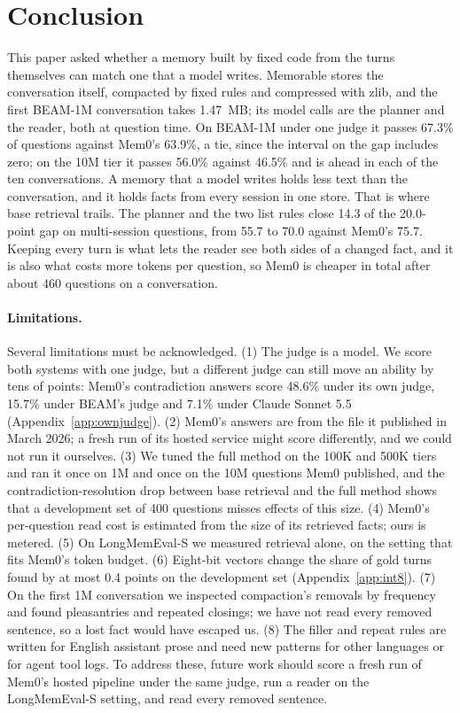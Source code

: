 \section{Conclusion}
\label{sec:conclusion}

This paper asked whether a memory built by fixed code from the turns themselves can match one that a model writes. Memorable stores the conversation itself, compacted by fixed rules and compressed with zlib, and the first BEAM-1M conversation takes 1.47~MB; its model calls are the planner and the reader, both at question time. On BEAM-1M under one judge it passes 67.3\% of questions against Mem0's 63.9\%, a tie, since the interval on the gap includes zero; on the 10M tier it passes 56.0\% against 46.5\% and is ahead in each of the ten conversations. A memory that a model writes holds less text than the conversation, and it holds facts from every session in one store. That is where base retrieval trails. The planner and the two list rules close 14.3 of the 20.0-point gap on multi-session questions, from 55.7 to 70.0 against Mem0's 75.7. Keeping every turn is what lets the reader see both sides of a changed fact, and it is also what costs more tokens per question, so Mem0 is cheaper in total after about 460 questions on a conversation.

\paragraph{Limitations.} Several limitations must be acknowledged. (1) The judge is a model. We score both systems with one judge, but a different judge can still move an ability by tens of points: Mem0's contradiction answers score 48.6\% under its own judge, 15.7\% under BEAM's judge and 7.1\% under Claude Sonnet 5.5 (Appendix~\ref{app:ownjudge}). (2) Mem0's answers are from the file it published in March 2026; a fresh run of its hosted service might score differently, and we could not run it ourselves. (3) We tuned the full method on the 100K and 500K tiers and ran it once on 1M and once on the 10M questions Mem0 published, and the contradiction-resolution drop between base retrieval and the full method shows that a development set of 400 questions misses effects of this size. (4) Mem0's per-question read cost is estimated from the size of its retrieved facts; ours is metered. (5) On LongMemEval-S we measured retrieval alone, on the setting that fits Mem0's token budget. (6) Eight-bit vectors change the share of gold turns found by at most 0.4 points on the development set (Appendix~\ref{app:int8}). (7) On the first 1M conversation we inspected compaction's removals by frequency and found pleasantries and repeated closings; we have not read every removed sentence, so a lost fact would have escaped us. (8) The filler and repeat rules are written for English assistant prose and need new patterns for other languages or for agent tool logs. To address these, future work should score a fresh run of Mem0's hosted pipeline under the same judge, run a reader on the LongMemEval-S setting, and read every removed sentence.

